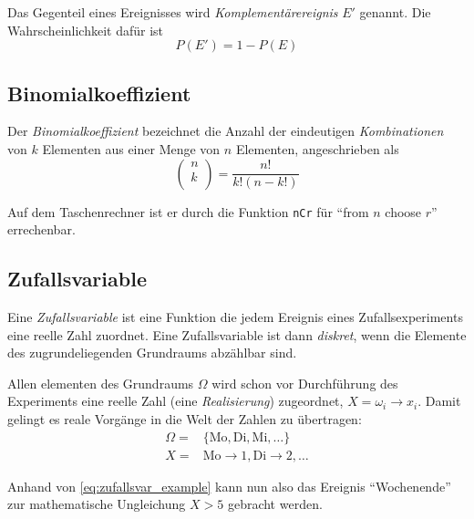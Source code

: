 \documentclass[twocolumn]{article}
\newcommand{\term}[1]{\emph{#1}}
\newcommand{\calcc}[1]{\texttt{#1}}
\begin{document}
Das Gegenteil eines Ereignisses wird \term{Komplementärereignis} $E'$ genannt. Die Wahrscheinlichkeit dafür ist
\begin{equation*}
    P(E') = 1 - P(E)
\end{equation*}

\subsection{Binomialkoeffizient}

Der \term{Binomialkoeffizient} bezeichnet die Anzahl der eindeutigen \term{Kombinationen} von $k$ Elementen aus einer Menge von $n$ Elementen, angeschrieben als
\begin{equation*}
    \begin{pmatrix}n \\ k \\\end{pmatrix} = \frac{n!}{k!(n - k!)}
\end{equation*}

Auf dem Taschenrechner ist er durch die Funktion \calcc{nCr} für \enquote{from $n$ choose $r$} errechenbar.

\subsection{Zufallsvariable}

Eine \term{Zufallsvariable} ist eine Funktion die jedem Ereignis eines Zufallsexperiments eine reelle Zahl zuordnet. Eine Zufallsvariable ist dann \term{diskret}, wenn die Elemente des zugrundeliegenden Grundraums abzählbar sind.

Allen elementen des Grundraums $\Omega$ wird schon vor Durchführung des Experiments eine reelle Zahl (eine \term{Realisierung}) zugeordnet, $X = \omega_i \rightarrow x_i$. Damit gelingt es reale Vorgänge in die Welt der Zahlen zu übertragen:
\begin{equation}\label{eq:zufallsvar_example}
    \begin{split}
        \Omega =& \{\mathrm{Mo, Di, Mi, \ldots}\} \\
        X =& \mathrm{Mo} \rightarrow 1, \mathrm{Di} \rightarrow 2, \ldots
    \end{split}
\end{equation}

Anhand von \eqref{eq:zufallsvar_example} kann nun also das Ereignis \enquote{Wochenende} zur mathematische Ungleichung $X > 5$ gebracht werden.
\end{document}
